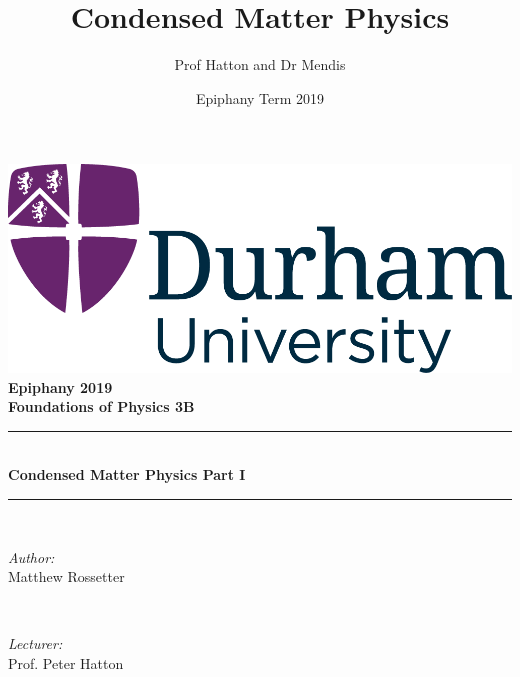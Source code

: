 \documentclass[a4paper, 11pt, normalem]{report}
\title{Condensed Matter Physics \vspace{-20pt}}
\author{Prof Hatton and Dr Mendis}
\date{\vspace{-15pt}Epiphany Term 2019}
\begin{document}
\begin{titlepage}
    \newcommand{\HRule}{\rule{\linewidth}{0.5mm}}
    \center
    {\includegraphics[scale=0.5]{../../logo0.png}\hfill{\Large\bfseries Epiphany 2019}}\\[2.5cm]
    {\LARGE\bfseries Foundations of Physics 3B}\\[1.5cm]
    \HRule \\[0.7cm]
    {\huge\bfseries Condensed Matter Physics Part I}\\[0.4cm]
    \HRule \\[1.5cm]

    \begin{minipage}{0.4\textwidth}
        \begin{flushleft} \large
            \emph{Author:} \\ Matthew Rossetter
        \end{flushleft}
    \end{minipage}~
    \begin{minipage}{0.4\textwidth}
        \begin{flushright} \large
            \emph{Lecturer:} \\ Prof. Peter Hatton
        \end{flushright}
    \end{minipage}\\[2cm]
    \vfill
\end{titlepage}
\end{document}
